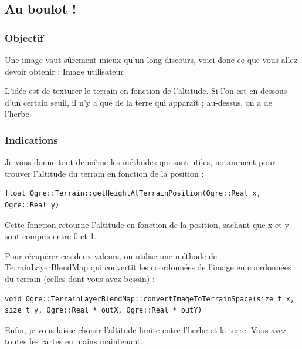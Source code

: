 \subsection{Au boulot !}



\subsubsection{Objectif}

Une image vaut s\^urement mieux qu'un long discours, voici donc ce que vous allez devoir obtenir :
Image utilisateur

L'idée est de texturer le terrain en fonction de l'altitude. Si l'on est en dessous d'un certain seuil, il n'y a que de la terre qui apparaît ; au-dessus, on a de l'herbe.



\subsubsection{Indications}

Je vous donne tout de même les méthodes qui sont utiles, notamment pour trouver l'altitude du terrain en fonction de la position :

\begin{lstlisting}[caption={méthode getHeightAtTerrainPosition pour trouver l'altitude du terrain en fonction de la position }]
float Ogre::Terrain::getHeightAtTerrainPosition(Ogre::Real x, Ogre::Real y)
\end{lstlisting}

Cette fonction retourne l'altitude en fonction de la position, sachant que x et y sont compris entre 0 et 1.

Pour récupérer ces deux valeurs, on utilise une méthode de TerrainLayerBlendMap qui convertit les coordonnées de l'image en coordonnées du terrain (celles dont vous avez besoin) :

\begin{lstlisting}[caption={Méthode convertImageToTerrainSpace pour convertir les coordonnées de l'image en coordonnées du terrain}]
void Ogre::TerrainLayerBlendMap::convertImageToTerrainSpace(size_t x, size_t y, Ogre::Real * outX, Ogre::Real * outY)
\end{lstlisting}


Enfin, je vous laisse choisir l'altitude limite entre l'herbe et la terre. Vous avez toutes les cartes en mains maintenant.

























